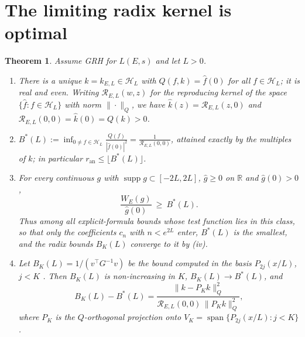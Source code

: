 \documentclass[11pt]{amsart}
\newtheorem{theorem}{Theorem}
\theoremstyle{definition}
\theoremstyle{remark}
\newcommand{\R}{\mathbb{R}}
\newcommand{\ran}{r_{\mathrm{an}}}
\newcommand{\Rad}{\mathcal{R}_{E,L}}
\newcommand{\Hs}{\mathcal{H}_L}
\DeclareMathOperator{\supp}{supp}
\begin{document}
\section{The limiting radix kernel is optimal}

\begin{theorem}\label{thm:main}
Assume GRH for $L(E,s)$ and let $L>0$.
\begin{enumerate}[label=\textup{(\roman*)}]
\item There is a unique $k=k_{E,L}\in\Hs$ with $Q(f,k)=\hat f(0)$ for all $f\in\Hs$; it is real and even. Writing
      $\Rad(w,z)$ for the reproducing kernel of the space $\{\hat f:f\in\Hs\}$ with norm $\|\cdot\|_Q$, we have
      $\hat k(z)=\Rad(z,0)$ and $\Rad(0,0)=\hat k(0)=Q(k)>0$.
\item $\displaystyle B^*(L):=\inf_{0\ne f\in\Hs}\frac{Q(f)}{|\hat f(0)|^2}=\frac1{\Rad(0,0)}$, attained exactly by the
      multiples of $k$; in particular $\ran\le\lfloor B^*(L)\rfloor$.
\item For every continuous $g$ with $\supp g\subset[-2L,2L]$, $\hat g\ge0$ on $\R$ and $\hat g(0)>0$,
      \[
        \frac{W_E(g)}{\hat g(0)}\ \ge\ B^*(L).
      \]
      Thus among all explicit-formula bounds whose test function lies in this class, so that only the coefficients
      $c_n$ with $n<e^{2L}$ enter, $B^*(L)$ is the smallest, and the radix bounds $B_K(L)$ converge to it by (iv).
\item Let $B_K(L)=1/(v^\top G^{-1}v)$ be the bound computed in the basis $P_{2j}(x/L)$, $j<K$ \cite[Sect.~3]{Hac}. Then $B_K(L)$
      is non-increasing in $K$, $B_K(L)\to B^*(L)$, and
      \[
        B_K(L)-B^*(L)=\frac{\|k-P_Kk\|_Q^2}{\Rad(0,0)\,\|P_Kk\|_Q^2},
      \]
      where $P_K$ is the $Q$-orthogonal projection onto $V_K=\operatorname{span}\{P_{2j}(x/L):j<K\}$.
\end{enumerate}
\end{theorem}
\end{document}
